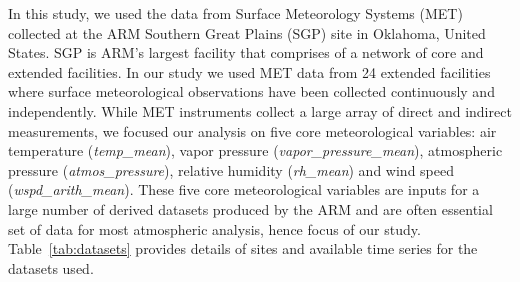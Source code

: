 In this study, we used the data from Surface Meteorology Systems (MET)
collected at the ARM Southern Great Plains (SGP) site in
Oklahoma, United States. SGP is ARM's largest facility that
comprises of a network of core and extended facilities. In our study we
used MET data from 24 extended facilities where surface meteorological
observations have been collected continuously and independently. 
While MET instruments collect a large array of direct and indirect
measurements, we focused our analysis on five core meteorological variables:
air temperature (\textit{temp\_mean}), vapor pressure
(\textit{vapor\_pressure\_mean}),
atmospheric pressure (\textit{atmos\_pressure}), relative humidity
(\textit{rh\_mean}) and wind speed
(\textit{wspd\_arith\_mean}). These five core meteorological variables are
inputs for a large number of derived datasets produced by the ARM and
are often essential set of data for most atmospheric analysis, hence
focus of our study. Table~\ref{tab:datasets} provides details of sites
and available time series for the datasets used.
